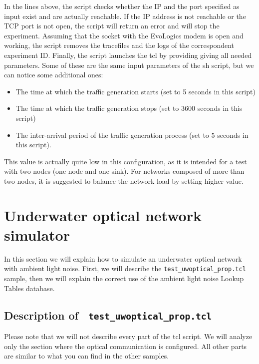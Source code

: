 \documentclass[11pt]{article}
\begin{document}
In the lines above, the script checks whether the IP and the port specified as input exist and are actually reachable. If the IP address is not reachable or the TCP port is not open, the script will return an error and will stop the experiment. 
Assuming that the socket with the EvoLogics modem is open and working, the script removes the tracefiles and the logs of the correspondent experiment ID. Finally, the script launches the tcl by providing giving all needed parameters. Some of these are the same input parameters of the sh script, but we can notice some additional ones:
\begin{itemize}
\item The time at which the traffic generation starts (set to 5 seconds in this script)
\item The time at which the traffic generation stops (set to 3600 seconds in this script)
\item The inter-arrival period of the traffic generation process (set to 5 seconds in this script).
\end{itemize}
This value is actually quite low in this configuration, as it is intended for a test with two nodes (one node and one sink). For networks composed of more than two nodes, it is suggested to balance the network load by setting higher value.

\clearpage

\section{Underwater optical network simulator}
In this section we will explain how to simulate an underwater optical network with ambient light noise. First, we will describe the {\tt test\_uwoptical\_prop.tcl} sample, then we will explain the correct use of the ambient light noise Lookup Tables database.
\subsection{Description of  \ {\tt test\_uwoptical\_prop.tcl}}
Please note that we will not describe every part of the tcl script. We will analyze only the section where the optical communication is configured. All other parts are similar to what you can find in the other samples.
\end{document}
